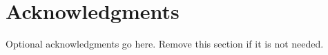 \section*{Acknowledgments}

Optional acknowledgments go here.
Remove this section if it is not needed.
